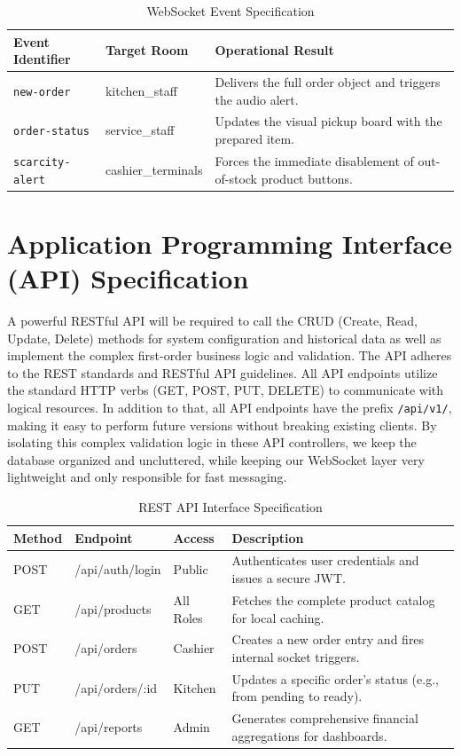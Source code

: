 \begin{table}[h]
\centering
\caption{WebSocket Event Specification}
\label{tab:websocket}
\begin{tabular}{|l|p{3.5cm}|p{6.5cm}|}
\hline
Event Identifier & Target Room & Operational Result \\ \hline
\texttt{new-order} & kitchen\_staff & Delivers the full order object and triggers the audio alert. \\ \hline
\texttt{order-status} & service\_staff & Updates the visual pickup board with the prepared item. \\ \hline
\texttt{scarcity-alert} & cashier\_terminals & Forces the immediate disablement of out-of-stock product buttons. \\ \hline
\end{tabular}
\end{table}

\section{Application Programming Interface (API) Specification}

A powerful RESTful API will be required to call the CRUD (Create, Read, Update, Delete) methods for system configuration and historical data as well as implement the complex first-order business logic and validation. The API adheres to the REST standards and RESTful API guidelines. All API endpoints utilize the standard HTTP verbs (GET, POST, PUT, DELETE) to communicate with logical resources. In addition to that, all API endpoints have the prefix \texttt{/api/v1/}, making it easy to perform future versions without breaking existing clients. By isolating this complex validation logic in these API controllers, we keep the database organized and uncluttered, while keeping our WebSocket layer very lightweight and only responsible for fast messaging.

\begin{table}[h]
\centering
\caption{REST API Interface Specification}
\label{tab:rest_api}
\begin{tabular}{|l|p{3cm}|p{2cm}|p{6cm}|}
\hline
Method & Endpoint & Access & Description \\ \hline
POST & /api/auth/login & Public & Authenticates user credentials and issues a secure JWT. \\ \hline
GET & /api/products & All Roles & Fetches the complete product catalog for local caching. \\ \hline
POST & /api/orders & Cashier & Creates a new order entry and fires internal socket triggers. \\ \hline
PUT & /api/orders/:id & Kitchen & Updates a specific order's status (e.g., from pending to ready). \\ \hline
GET & /api/reports & Admin & Generates comprehensive financial aggregations for dashboards. \\ \hline
\end{tabular}
\end{table}


